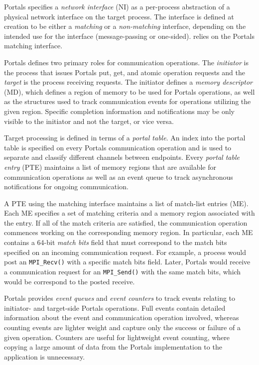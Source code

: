 Portals specifies a {\em network interface} (NI) as a per-process
abstraction of a physical network interface on the target process. The
interface is defined at creation to be either a {\em matching}
or a {\em non-matching} interface, depending on the intended use for
the interface (message-passing or one-sided). \pdht relies on the
Portals matching interface.

Portals defines two primary roles for communication operations. The
{\em initiator} is the process that issues Portals put, get, and atomic operation
requests and the {\em target} is the process receiving
requests. The initiator defines a {\em memory descriptor} (MD), which defines a
region of memory to be used for Portals operations, as well as the
structures used to track communication events for operations utilizing the
given region.  Specific completion information
and notifications may be only visible to the initiator and not the
target, or vice versa.

Target processing is defined in terms of a {\em portal table}. An index into the
portal table is specified on every Portals communication operation and
is used to separate and classify different channels between endpoints.
Every {\em portal table entry} (PTE) maintains a list of memory regions that
are available for communication operations as well as an event queue
to track asynchronous notifications for ongoing communication.

A PTE using the matching interface maintains a list of match-list
entries (ME). Each ME specifies a set of matching criteria and a
memory region associated with the entry. If all of the match criteria
are satisfied, the communication operation commences working on
the corresponding memory region. In particular, each ME contains a 64-bit
{\em match bits} field that must correspond to the match bits
specified on an incoming communication request. For example, a process
would post an {\tt MPI\_Recv()} with a specific match bits
field. Later, Portals would receive a communication request for an
{\tt MPI\_Send()} with the same match bits, which would be correspond
to the posted receive.

Portals provides {\em event queues} and {\em event counters} to track events
relating to initiator- and target-side Portals operations.  Full events contain
detailed information about the event and communication operation involved,
whereas counting events are lighter weight and capture only the success or
failure of a given operation.
Counters are useful for lightweight event counting, where copying a
large amount of data from the Portals implementation to the
application is unnecessary.

